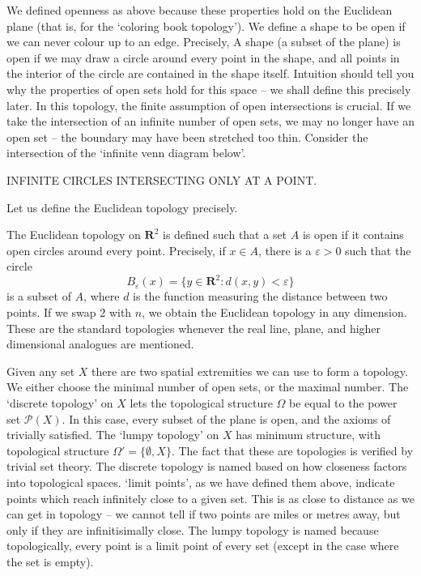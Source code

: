 We defined openness as above because these properties hold on the Euclidean plane (that is, for the `coloring book topology'). We define a shape to be open if we can never colour up to an edge. Precisely, A shape (a subset of the plane) is open if we may draw a circle around every point in the shape, and all points in the interior of the circle are contained in the shape itself. Intuition should tell you why the properties of open sets hold for this space -- we shall define this precisely later. In this topology, the finite assumption of open intersections is crucial. If we take the intersection of an infinite number of open sets, we may no longer have an open set -- the boundary may have been stretched too thin. Consider the intersection of the `infinite venn diagram below'.
%
\begin{center}
    INFINITE CIRCLES INTERSECTING ONLY AT A POINT.
\end{center}
%
Let us define the Euclidean topology precisely.

\begin{example}
    The Euclidean topology on $\mathbf{R}^2$ is defined such that a set $A$ is open if it contains open circles around every point. Precisely, if $x \in A$, there is a $\varepsilon > 0$ such that the circle
    \[ B_\varepsilon(x) = \{ y \in \mathbf{R}^2: d(x,y) < \varepsilon \} \]
    is a subset of $A$, where $d$ is the function measuring the distance between two points. If we swap $2$ with $n$, we obtain the Euclidean topology in any dimension. These are the standard topologies whenever the real line, plane, and higher dimensional analogues are mentioned.
\end{example}

Given any set $X$ there are two spatial extremities we can use to form a topology. We either choose the minimal number of open sets, or the maximal number. The `discrete topology' on $X$ lets the topological structure $\Omega$ be equal to the power set $\mathcal{P}(X)$. In this case, every subset of the plane is open, and the axioms of trivially satisfied. The `lumpy topology' on $X$ has minimum structure, with topological structure $\Omega' = \{\emptyset, X\}$. The fact that these are topologies is verified by trivial set theory. The discrete topology is named based on how closeness factors into topological spaces. `limit points', as we have defined them above, indicate points which reach infinitely close to a given set. This is as close to distance as we can get in topology -- we cannot tell if two points are miles or metres away, but only if they are infinitisimally close. The lumpy topology is named because topologically, every point is a limit point of every set (except in the case where the set is empty).

